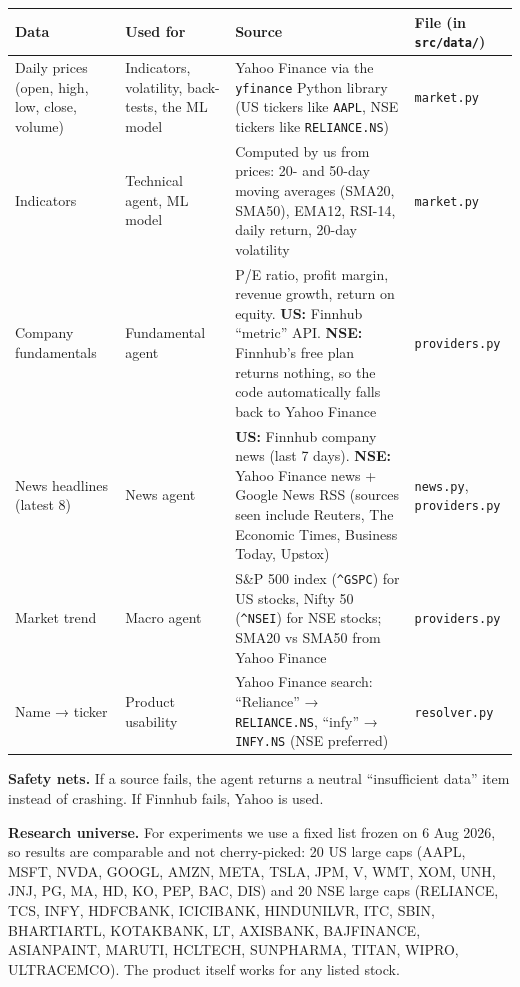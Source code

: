 \documentclass[10.5pt,a4paper]{article}
\newcommand{\file}[1]{\texttt{#1}}
\begin{document}
{\small
\begin{tabularx}{\linewidth}{L{2.5cm}L{2.7cm}YL{2.3cm}}
\toprule
\textbf{Data} & \textbf{Used for} & \textbf{Source} & \textbf{File (in \file{src/data/})} \\
\midrule
Daily prices (open, high, low, close, volume) & Indicators, volatility, back-tests, the ML model & Yahoo Finance via the \file{yfinance} Python library (US tickers like \file{AAPL}, NSE tickers like \file{RELIANCE.NS}) & \file{market.py} \\
Indicators & Technical agent, ML model & Computed by us from prices: 20- and 50-day moving averages (SMA20, SMA50), EMA12, RSI-14, daily return, 20-day volatility & \file{market.py} \\
Company fundamentals & Fundamental agent & P/E ratio, profit margin, revenue growth, return on equity. \textbf{US:} Finnhub ``metric'' API. \textbf{NSE:} Finnhub's free plan returns nothing, so the code automatically falls back to Yahoo Finance & \file{providers.py} \\
News headlines (latest 8) & News agent & \textbf{US:} Finnhub company news (last 7 days). \textbf{NSE:} Yahoo Finance news + Google News RSS (sources seen include Reuters, The Economic Times, Business Today, Upstox) & \file{news.py}, \file{providers.py} \\
Market trend & Macro agent & S\&P 500 index (\file{\textasciicircum GSPC}) for US stocks, Nifty 50 (\file{\textasciicircum NSEI}) for NSE stocks; SMA20 vs SMA50 from Yahoo Finance & \file{providers.py} \\
Name → ticker & Product usability & Yahoo Finance search: ``Reliance'' → \file{RELIANCE.NS}, ``infy'' → \file{INFY.NS} (NSE preferred) & \file{resolver.py} \\
\bottomrule
\end{tabularx}}

\textbf{Safety nets.} If a source fails, the agent returns a neutral ``insufficient data'' item instead of crashing. If Finnhub fails, Yahoo is used.

\textbf{Research universe.} For experiments we use a fixed list frozen on 6 Aug 2026, so results are comparable and not cherry-picked: 20 US large caps (AAPL, MSFT, NVDA, GOOGL, AMZN, META, TSLA, JPM, V, WMT, XOM, UNH, JNJ, PG, MA, HD, KO, PEP, BAC, DIS) and 20 NSE large caps (RELIANCE, TCS, INFY, HDFCBANK, ICICIBANK, HINDUNILVR, ITC, SBIN, BHARTIARTL, KOTAKBANK, LT, AXISBANK, BAJFINANCE, ASIANPAINT, MARUTI, HCLTECH, SUNPHARMA, TITAN, WIPRO, ULTRACEMCO). The product itself works for any listed stock.
\end{document}
